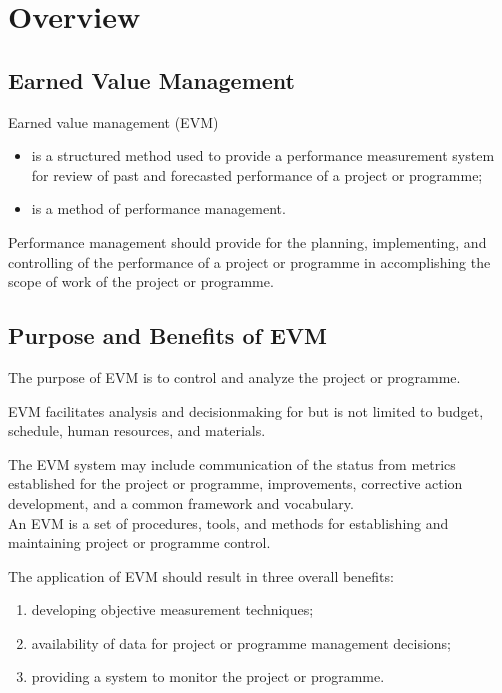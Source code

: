 \documentclass[letterpaper,10pt,english]{jupyterBook}
\begin{document}
\section{Overview}
\label{\detokenize{PM/evm:overview}}

\subsection{Earned Value Management}
\label{\detokenize{PM/evm:id1}}
\sphinxAtStartPar
Earned value management (EVM)
\begin{itemize}
\item {} 
\sphinxAtStartPar
is a structured method used to provide a performance measurement system for review of past and forecasted performance of a project or programme;

\item {} 
\sphinxAtStartPar
is a method of performance management.

\end{itemize}

\sphinxAtStartPar
Performance management should provide for the planning, implementing, and controlling of the performance of a project or programme in accomplishing the scope of work of the project or programme.


\subsection{Purpose and Benefits of EVM}
\label{\detokenize{PM/evm:purpose-and-benefits-of-evm}}
\sphinxAtStartPar
The purpose of EVM is to control and analyze the project or programme.

\sphinxAtStartPar
EVM facilitates analysis and decision\sphinxhyphen{}making for but is not limited to budget, schedule, human resources, and materials.

\sphinxAtStartPar
The EVM system may include communication of the status from metrics established for the project or programme, improvements, corrective action development, and a common framework and vocabulary. \\
An EVM is a set of procedures, tools, and methods for establishing and maintaining project or programme control.

\sphinxAtStartPar
The application of EVM should result in three overall benefits:
\begin{enumerate}
%
\item {} 
\sphinxAtStartPar
developing objective measurement techniques;

\item {} 
\sphinxAtStartPar
availability of data for project or programme management decisions;

\item {} 
\sphinxAtStartPar
providing a system to monitor the project or programme.

\end{enumerate}
\end{document}
